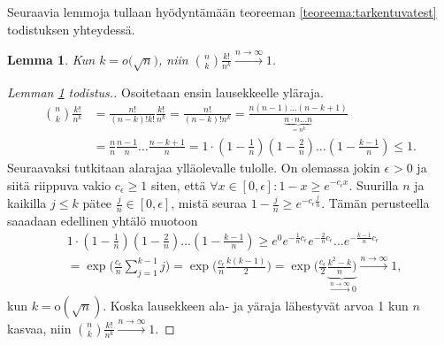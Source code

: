 \documentclass[finnish,12pt,a4paper,pdftex,sci,utf8]{aaltothesis}
\newtheorem{lemma}{Lemma}
\begin{document}
Seuraavia lemmoja tullaan hyödyntämään teoreeman \ref{teoreema:tarkentuvatest} todistuksen yhteydessä.
\begin{lemma}
	\label{lemma:kombinaatiokertoma_nk}
	Kun $k = o\big(\sqrt{n}\big)$, niin $\binom{n}{k}\frac{k!}{n^{k}} \xrightarrow{n \to \infty} 1$.
\end{lemma}
\begin{proof}[Lemman \ref{lemma:kombinaatiokertoma_nk} todistus.]
	Osoitetaan ensin lausekkeelle yläraja.
	\begin{align*}
		\binom{n}{k}\frac{k!}{n^{k}} &= \frac{n!}{(n-k)!k!} \frac{k!}{n^k} = \frac{n!}{(n-k)!n^k} = \frac{n (n-1) \ldots (n-k+1)}{\underbrace{n \cdot n \ldots n}_{=n^k}}  \\ &= \frac{n}{n} \frac{n-1}{n} \ldots \frac{n-k+1}{n} = 1 \cdot (1 -\frac{1}{n}) (1-\frac{2}{n}) \ldots (1 - \frac{k-1}{n}) \leq 1.
	\end{align*}
	Seuraavaksi tutkitaan alarajaa ylläolevalle tulolle. On olemassa jokin $\epsilon_{}^{} > 0$ ja siitä riippuva vakio $c_{\epsilon} \geq 1$ siten, että $\forall x \in [0, \epsilon] : 1-x \geq e^{-c_{\epsilon}x}$. Suurilla $n$ ja kaikilla $j \leq k$ pätee $\frac{j}{n} \in [0, \epsilon]$, mistä seuraa $1 - \frac{j}{n} \geq e^{-c_{\epsilon} \frac{j}{n}}$. Tämän perusteella saaadaan edellinen yhtälö muotoon
	\begin{align*}
		&1 \cdot (1 -\frac{1}{n}) (1-\frac{2}{n}) \ldots (1 - \frac{k-1}{n}) \geq e^0 e^{-\frac{1}{n}c{_\epsilon}} e^{-\frac{2}{n}c{_\epsilon}} \ldots e^{-\frac{k-1}{n}c{_\epsilon}} \\
		&= \exp \big(\frac{c{_\epsilon}}{n} \sum_{j=1}^{k-1} j \big) = \exp \big(\frac{c{_\epsilon}}{n} \frac{k(k-1)}{2} \big) = \exp \big(\frac{c{_\epsilon}}{2} \underbrace{\frac{k^2 - k}{n} \big)}_{\xrightarrow{n \rightarrow \infty}0}  \xrightarrow{n \rightarrow \infty} 1,
	\end{align*}
	kun $k = \text{o}(\sqrt{n})$. Koska lausekkeen ala- ja yäraja lähestyvät arvoa 1 kun $n$ kasvaa, niin $\binom{n}{k}\frac{k!}{n^{k}} \xrightarrow{n \to \infty} 1$.
\end{proof}
\end{document}
